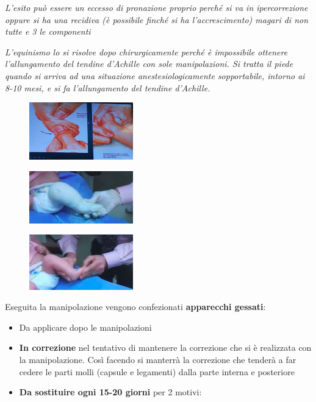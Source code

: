 \begin{itemize}
\begin{itemize}
\emph{L'esito può essere un eccesso di pronazione proprio perché si va in ipercorrezione oppure si ha una recidiva (è possibile finché si ha l'accrescimento) magari di non tutte e 3 le componenti}

\emph{L'equinismo lo si risolve dopo chirurgicamente perché è impossibile ottenere l'allungamento del tendine d'Achille con sole manipolazioni. Si tratta il piede quando si arriva ad una situazione anestesiologicamente sopportabile, intorno ai 8-10 mesi, e si fa l'allungamento del tendine d'Achille.}

\begin{figure}[!ht]
\centering
\includegraphics[width=0.4\textwidth]{016/image15.png}
\end{figure}

\begin{figure}[!ht]
\centering
\includegraphics[width=0.4\textwidth]{016/image16.png}
\end{figure}

\begin{figure}[!ht]
\centering
\includegraphics[width=0.4\textwidth]{016/image17.png}
\end{figure}

Eseguita la manipolazione vengono confezionati \textbf{apparecchi gessati}:

		\begin{itemize}
\item
  Da applicare dopo le manipolazioni
\item
  \textbf{In correzione} nel tentativo di mantenere la correzione che si è realizzata con la manipolazione. Così facendo si manterrà la correzione che tenderà a far cedere le parti molli (capsule e legamenti) dalla parte interna e posteriore
\item
  \textbf{Da sostituire ogni 15-20 giorni} per 2 motivi:


\end{itemize}
\end{itemize}
\end{itemize}
